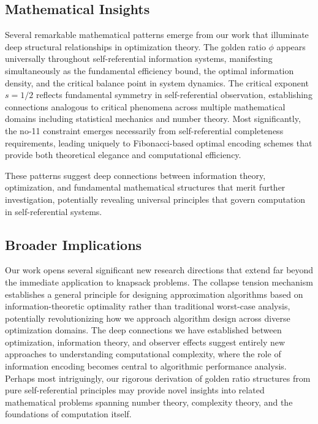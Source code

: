 \documentclass[11pt]{article}
\theoremstyle{remark}
\theoremstyle{definition}
\begin{document}
\subsection{Mathematical Insights}

Several remarkable mathematical patterns emerge from our work that illuminate deep structural relationships in optimization theory. The golden ratio $\phi$ appears universally throughout self-referential information systems, manifesting simultaneously as the fundamental efficiency bound, the optimal information density, and the critical balance point in system dynamics. The critical exponent $s = 1/2$ reflects fundamental symmetry in self-referential observation, establishing connections analogous to critical phenomena across multiple mathematical domains including statistical mechanics and number theory. Most significantly, the no-11 constraint emerges necessarily from self-referential completeness requirements, leading uniquely to Fibonacci-based optimal encoding schemes that provide both theoretical elegance and computational efficiency.

These patterns suggest deep connections between information theory, optimization, and fundamental mathematical structures that merit further investigation, potentially revealing universal principles that govern computation in self-referential systems.

\subsection{Broader Implications}

Our work opens several significant new research directions that extend far beyond the immediate application to knapsack problems. The collapse tension mechanism establishes a general principle for designing approximation algorithms based on information-theoretic optimality rather than traditional worst-case analysis, potentially revolutionizing how we approach algorithm design across diverse optimization domains. The deep connections we have established between optimization, information theory, and observer effects suggest entirely new approaches to understanding computational complexity, where the role of information encoding becomes central to algorithmic performance analysis. Perhaps most intriguingly, our rigorous derivation of golden ratio structures from pure self-referential principles may provide novel insights into related mathematical problems spanning number theory, complexity theory, and the foundations of computation itself.
\end{document}
